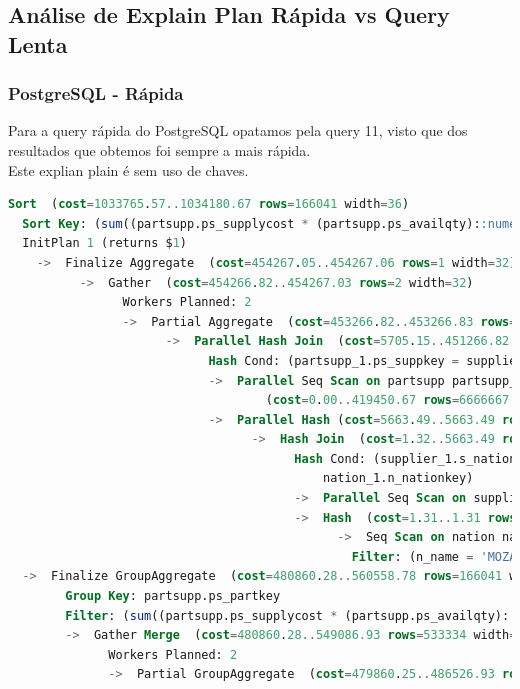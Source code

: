 \documentclass{article}
\begin{document}
\subsection{Análise de Explain Plan Rápida vs Query Lenta}
\subsubsection{PostgreSQL - Rápida}
Para a query rápida do PostgreSQL opatamos pela query 11, visto que dos resultados que obtemos foi sempre a mais rápida.\\

Este explian plain é sem uso de chaves.

\begin{lstlisting}[language=SQL]
Sort  (cost=1033765.57..1034180.67 rows=166041 width=36)
  Sort Key: (sum((partsupp.ps_supplycost * (partsupp.ps_availqty)::numeric))) DESC
  InitPlan 1 (returns $1)
    ->  Finalize Aggregate  (cost=454267.05..454267.06 rows=1 width=32)
          ->  Gather  (cost=454266.82..454267.03 rows=2 width=32)
                Workers Planned: 2
                ->  Partial Aggregate  (cost=453266.82..453266.83 rows=1 width=32)
                      ->  Parallel Hash Join  (cost=5705.15..451266.82 rows=266667 width=10)
                            Hash Cond: (partsupp_1.ps_suppkey = supplier_1.s_suppkey)
                            ->  Parallel Seq Scan on partsupp partsupp_1  
                                    (cost=0.00..419450.67 rows=6666667 width=14)
                            ->  Parallel Hash (cost=5663.49..5663.49 rows=3333 width=4)
                                  ->  Hash Join  (cost=1.32..5663.49 rows=3333 width=4)
                                        Hash Cond: (supplier_1.s_nationkey = 
                                            nation_1.n_nationkey)
                                        ->  Parallel Seq Scan on supplier supplier_1  (cost=0.00..5316.33 rows=83333 width=8)
                                        ->  Hash  (cost=1.31..1.31 rows=1 width=4)
                                              ->  Seq Scan on nation nation_1  (cost=0.00..1.31 rows=1 width=4)
                                                Filter: (n_name = 'MOZAMBIQUE'::bpchar)
  ->  Finalize GroupAggregate  (cost=480860.28..560558.78 rows=166041 width=36)
        Group Key: partsupp.ps_partkey
        Filter: (sum((partsupp.ps_supplycost * (partsupp.ps_availqty)::numeric)) > $1)
        ->  Gather Merge  (cost=480860.28..549086.93 rows=533334 width=36)
              Workers Planned: 2
              ->  Partial GroupAggregate  (cost=479860.25..486526.93 rows=266667 

\end{lstlisting}
\end{document}
